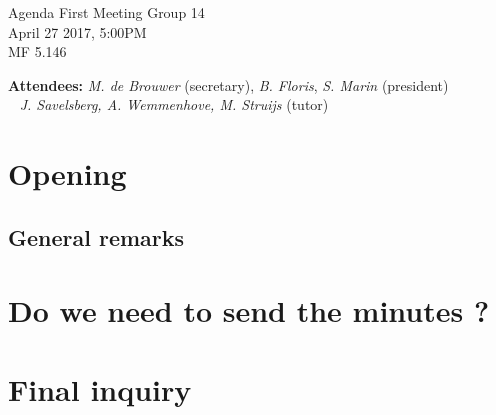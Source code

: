 \documentclass[a4paper,twoside,11pt]{article}
\title{}
\date{}
\begin{document}

\begin{center}
\Huge{Agenda First Meeting Group 14}
\\\vspace*{2mm}
\Large{April 27 2017, 5:00PM}
\\\vspace*{2mm}
\large{MF 5.146}
\\
		\end{center}

		\textbf{Attendees:} \textit{M. de Brouwer} (secretary), \textit{B. Floris}, \textit{S. Marin} (president)
\\\indent\qquad\,\,\,\,\,\qquad\quad \textit{J. Savelsberg, A. Wemmenhove, M. Struijs} (tutor)

	\section{Opening}
	\subsection*{\hspace{1.9em}General remarks}


	\section{Do we need to send the minutes ?}

	\section{Final inquiry}

	
\end{document}
